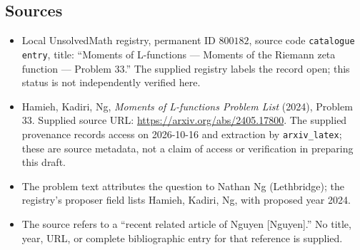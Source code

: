 \documentclass[11pt]{article}
\begin{document}
\subsection{Sources}
\begin{itemize}
\item Local UnsolvedMath registry, permanent ID \(800182\), source code \texttt{catalogue entry}, title: ``Moments of L-functions --- Moments of the Riemann zeta function --- Problem 33.'' The supplied registry labels the record open; this status is not independently verified here.
\item Hamieh, Kadiri, Ng, \emph{Moments of L-functions Problem List} (2024), Problem 33. Supplied source URL: \url{https://arxiv.org/abs/2405.17800}. The supplied provenance records access on 2026-10-16 and extraction by \texttt{arxiv\_latex}; these are source metadata, not a claim of access or verification in preparing this draft.
\item The problem text attributes the question to Nathan Ng (Lethbridge); the registry's proposer field lists Hamieh, Kadiri, Ng, with proposed year 2024.
\item The source refers to a ``recent related article of Nguyen [Nguyen].'' No title, year, URL, or complete bibliographic entry for that reference is supplied.
\end{itemize}
\end{document}
